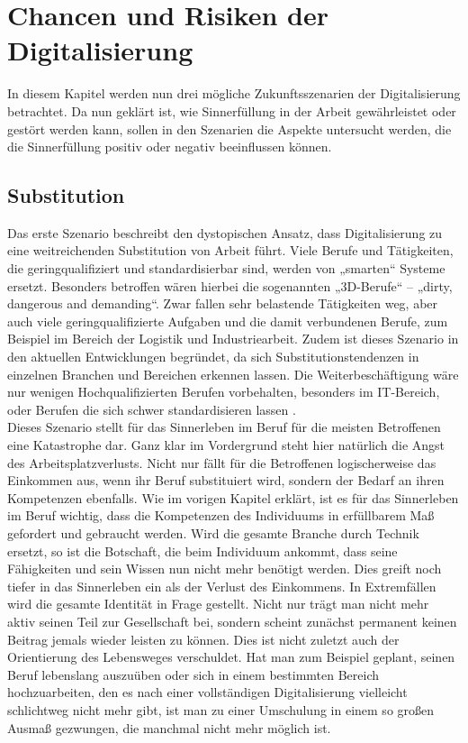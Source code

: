 \chapter{Chancen und Risiken der Digitalisierung}
In diesem Kapitel werden nun drei mögliche Zukunftsszenarien der Digitalisierung betrachtet. Da nun geklärt ist, wie Sinnerfüllung in der Arbeit gewährleistet oder gestört werden kann, sollen in den Szenarien die Aspekte untersucht werden, die die Sinnerfüllung positiv oder negativ beeinflussen können.
\section{Substitution}
Das erste Szenario beschreibt den dystopischen Ansatz, dass Digitalisierung zu eine weitreichenden Substitution von Arbeit führt. Viele Berufe und Tätigkeiten, die geringqualifiziert und standardisierbar sind, werden von „smarten“ Systeme ersetzt. Besonders betroffen wären hierbei die sogenannten „3D-Berufe“ – „dirty, dangerous and demanding“. Zwar fallen sehr belastende Tätigkeiten weg, aber auch viele geringqualifizierte Aufgaben und die damit verbundenen Berufe, zum Beispiel im Bereich der Logistik und Industriearbeit. Zudem ist dieses Szenario in den aktuellen Entwicklungen begründet, da sich Substitutionstendenzen in einzelnen Branchen und Bereichen erkennen lassen. Die Weiterbeschäftigung wäre nur wenigen Hochqualifizierten Berufen vorbehalten, besonders im IT-Bereich, oder Berufen die sich schwer standardisieren lassen \cite[S.182-183]{Eisenmann.2018}.\\

Dieses Szenario stellt für das Sinnerleben im Beruf für die meisten Betroffenen eine Katastrophe dar. Ganz klar im Vordergrund steht hier natürlich die Angst des Arbeitsplatzverlusts. Nicht nur fällt für die Betroffenen logischerweise das Einkommen aus, wenn ihr Beruf substituiert wird, sondern der Bedarf an ihren Kompetenzen ebenfalls. Wie im vorigen Kapitel erklärt, ist es für das Sinnerleben im Beruf wichtig, dass die Kompetenzen des Individuums in erfüllbarem Maß gefordert und gebraucht werden. Wird die gesamte Branche durch Technik ersetzt, so ist die Botschaft, die beim Individuum ankommt, dass seine Fähigkeiten und sein Wissen nun nicht mehr benötigt werden. Dies greift noch tiefer in das Sinnerleben ein als der Verlust des Einkommens. In Extremfällen wird die gesamte Identität in Frage gestellt. Nicht nur trägt man nicht mehr aktiv seinen Teil zur Gesellschaft bei, sondern scheint zunächst permanent keinen Beitrag jemals wieder leisten zu können. Dies ist nicht zuletzt auch der Orientierung des Lebensweges verschuldet. Hat man zum Beispiel geplant, seinen Beruf lebenslang auszuüben oder sich in einem bestimmten Bereich hochzuarbeiten, den es nach einer vollständigen Digitalisierung vielleicht schlichtweg nicht mehr gibt, ist man zu einer Umschulung in einem so großen Ausmaß gezwungen, die manchmal nicht mehr möglich ist. 
